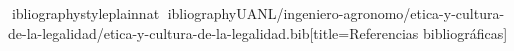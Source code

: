 \documentclass[spanish,letterpaper,oneside]{article}
\begin{document}
\hypersetup{pageanchor=false}
\begingroup
\fontsize{14}{17}\selectfont
\renewcommand{\Huge}{\fontsize{14}{17}\selectfont\bfseries}
\renewcommand{\large}{\fontsize{14}{17}\selectfont}
\templatePortrait
\clearpage
\endgroup
\hypersetup{pageanchor=true}
\templatePagecfg
\singlespacing
\setlength{\tabcolsep}{8pt}
\renewcommand{\arraystretch}{1.18}

\newpage
ibliographystyle{plainnat}
ibliography{UANL/ingeniero-agronomo/etica-y-cultura-de-la-legalidad/etica-y-cultura-de-la-legalidad.bib}[title={Referencias bibliográficas}]
\end{document}
